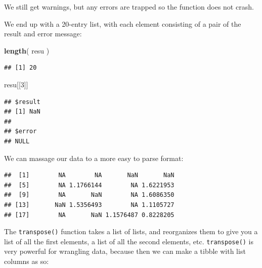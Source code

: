 \documentclass[
]{book}
\newenvironment{Shaded}{\begin{snugshade}}{\end{snugshade}}
\newcommand{\AttributeTok}[1]{\textcolor[rgb]{0.13,0.29,0.53}{#1}}
\newcommand{\DecValTok}[1]{\textcolor[rgb]{0.00,0.00,0.81}{#1}}
\newcommand{\FunctionTok}[1]{\textcolor[rgb]{0.13,0.29,0.53}{\textbf{#1}}}
\newcommand{\NormalTok}[1]{#1}
\newcommand{\OtherTok}[1]{\textcolor[rgb]{0.56,0.35,0.01}{#1}}
\newcommand{\SpecialCharTok}[1]{\textcolor[rgb]{0.81,0.36,0.00}{\textbf{#1}}}
\begin{document}
We still get warnings, but any errors are trapped so the function does not crash.

We end up with a 20-entry list, with each element consisting of a pair of the result and error message:

\begin{Shaded}
\begin{Highlighting}[]
\FunctionTok{length}\NormalTok{( resu )}
\end{Highlighting}
\end{Shaded}

\begin{verbatim}
## [1] 20
\end{verbatim}

\begin{Shaded}
\begin{Highlighting}[]
\NormalTok{resu[[}\DecValTok{3}\NormalTok{]]}
\end{Highlighting}
\end{Shaded}

\begin{verbatim}
## $result
## [1] NaN
## 
## $error
## NULL
\end{verbatim}

We can massage our data to a more easy to parse format:

\begin{Shaded}
\end{Shaded}

\begin{verbatim}
##  [1]        NA        NA       NaN       NaN
##  [5]        NA 1.1766144        NA 1.6221953
##  [9]        NA       NaN        NA 1.6086350
## [13]       NaN 1.5356493        NA 1.1105727
## [17]        NA       NaN 1.1576487 0.8228205
\end{verbatim}

The \texttt{transpose()} function takes a list of lists, and reorganizes them to give you a list of all the first elements, a list of all the second elements, etc.
\texttt{transpose()} is very powerful for wrangling data, because then we can make a tibble with list columns as so:

\begin{Shaded}
\end{Shaded}
\end{document}
